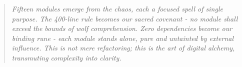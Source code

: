 \documentclass[11pt]{article}
\begin{document}
\begin{quote}
\emph{Fifteen modules emerge from the chaos, each a focused spell of single purpose. The 400-line rule becomes our sacred covenant - no module shall exceed the bounds of wolf comprehension. Zero dependencies become our binding rune - each module stands alone, pure and untainted by external influence. This is not mere refactoring; this is the art of digital alchemy, transmuting complexity into clarity.}
\end{quote}
\end{document}
